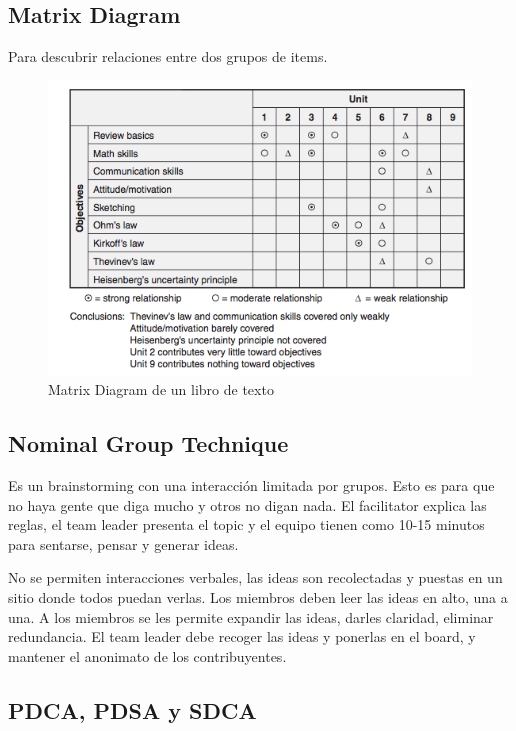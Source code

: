 \documentclass[]{article}
\begin{document}
\subsection{Matrix Diagram}

Para descubrir relaciones entre dos grupos de items. 

\begin{figure}[ht!]
	\centering
	\includegraphics[width=120mm]{imagenes/MatrixDiagram.png}
	\caption{Matrix Diagram de un libro de texto}
	\label{fig:MatrixDiagram}
\end{figure}

\subsection{Nominal Group Technique}

Es un brainstorming con una interacción limitada por grupos. Esto es para que no haya gente que diga mucho y otros no digan nada. El facilitator explica las reglas, el team leader presenta el topic y el equipo tienen como 10-15 minutos para sentarse, pensar y generar ideas.

No se permiten interacciones verbales, las ideas son recolectadas y puestas en un sitio donde todos puedan verlas. Los miembros deben leer las ideas en alto, una a una. A los miembros se les permite expandir las ideas, darles claridad, eliminar redundancia. El team leader debe recoger las ideas y ponerlas en el board, y mantener el anonimato de los contribuyentes.

\subsection{PDCA, PDSA y SDCA}
\end{document}

